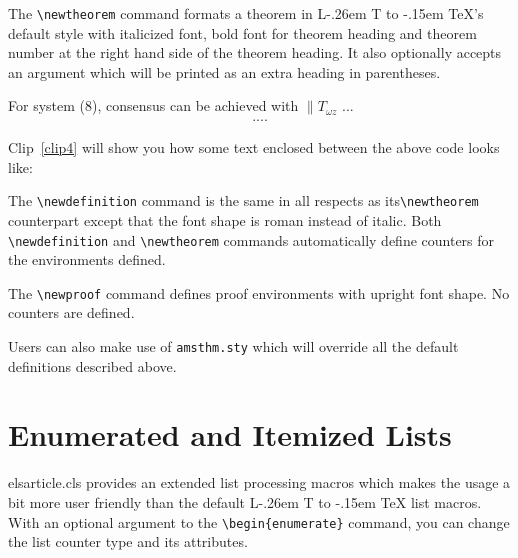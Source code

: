 \documentclass[a4paper,12pt]{article}
\makeatletter
\def\bs{\expandafter\@gobble\string\\}
\def\file#1{\textsf{#1}\xspace}
\DeclareRobustCommand{\LaTeX}{L\kern-.26em%
	        {\sbox\z@ T%
	         \vbox to\ht\z@{\hbox{\check@mathfonts
	           \fontsize\sf@size\z@
	           \math@fontsfalse\selectfont
	          A\,}%
	         \vss}%
	        }%
	     \kern-.15em%
	    \TeX}
\makeatother
\begin{document}
	The \verb+\newtheorem+ command formats a
	theorem in \LaTeX's default style with italicized font, bold font
	for theorem heading and theorem number at the right hand side of the
	theorem heading.  It also optionally accepts an argument which
	will be printed as an extra heading in parentheses. 
	
	\begin{vquote}
	  \begin{thm} 
	   For system (8), consensus can be achieved with $\|T_{\omega z}$
	   ...
	     \begin{eqnarray}\label{10}
	     ....
	     \end{eqnarray}
	  \end{thm}
	\end{vquote}  
	
	Clip~\ref{clip4} will show you how some text enclosed between the
	above code looks like:
	
	\vspace*{6pt}
	\def\rulecolor{blue!70}
	\src{{\ttfamily\color{verbcolor}\bs newtheorem}}
	\def\rulecolor{orange}
	
	The \verb+\newdefinition+ command is the same in
	all respects as its\linebreak \verb+\newtheorem+ counterpart except that
	the font shape is roman instead of italic.  Both
	\verb+\newdefinition+ and \verb+\newtheorem+ commands
	automatically define counters for the environments defined.
	
	\vspace*{12pt}
	\def\rulecolor{blue!70}
	\src{{\ttfamily\color{verbcolor}\bs newdefinition}}
	\def\rulecolor{orange}
	
	The \verb+\newproof+ command defines proof environments with
	upright font shape.  No counters are defined. 
	
	\vspace*{6pt}
	\def\rulecolor{blue!70}
	\src{{\ttfamily\color{verbcolor}\bs newproof}}
	\def\rulecolor{orange}
	
	Users can also make use of \verb+amsthm.sty+ which will override
	all the default definitions described above.
	
	\section[Enumerated ...]{Enumerated and Itemized Lists}
	\file{elsarticle.cls} provides an extended list processing macros
	which makes the usage a bit more user friendly than the default
	\LaTeX{} list macros.   With an optional argument to the
	\verb+\begin{enumerate}+ command, you can change the list counter
	type and its attributes.
	
\end{document}
